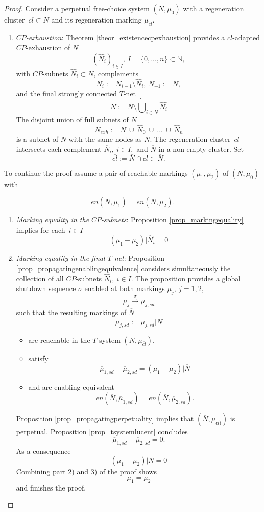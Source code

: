 \documentclass{fundam}
\newcommand{\qed}{}
\begin{document}
\begin{proof} Consider a perpetual free-choice system $(N,\mu_0)$ with a regeneration \mbox{cluster $cl \subset N$} and its regeneration marking $\mu_{cl}$.
\begin{enumerate}
\item \emph{$CP$-exhaustion}: Theorem \ref{theor_existencecpexhaustion} provides a $cl$-adapted
$CP$-exhaustion of $N$
$${(\hat{N}_i)}_{i \in I},\ I=\{0,...,n\} \subset \mathbb{N},$$
with $CP$-subnets $\hat{N}_i \subset N$, complements
$$\overline{N}_i:=\overline{N}_{i-1}\setminus \hat{N}_i,\ \overline{N}_{-1}:=N,$$
and the final strongly connected $T$-net
$$\overline{N}:=N\setminus \dot\bigcup_{i\in N} \hat{N_i}$$
The disjoint union of full subnets of $N$
$$N_{exh}:= \overline{N}\ \dot\cup\ \hat{N}_0\ \dot\cup \ ...\ \dot\cup \ \hat{N}_n$$
is a subnet of $N$ with the same nodes as $N$. The regeneration \mbox{cluster $cl$} intersects each complement
$\overline{N}_i,\ i \in I,$ and $\overline{N}$ in a non-empty cluster. Set
$$\overline{cl}:= \overline{N} \cap cl \subset \overline{N}.$$
\end{enumerate}\bigskip
\begin{flushleft}
To continue the proof assume a pair of reachable markings $(\mu_1,\mu_2)$ of $(N,\mu_0)$ with
\end{flushleft}
$$en(N,\mu_1)=en(N,\mu_2).$$
\begin{enumerate}[start=2]
\item \emph{Marking equality in the $CP$-subnets}:
Proposition \ref{prop_markingequality} implies for \mbox{each $i \in I$}
$$(\mu_1-\mu_2)|\hat{N}_i=0$$
\item \emph{Marking equality in the final $T$-net}: Proposition \ref{prop_propagatingenablingequivalence} considers simultaneously the collection of all $CP$-subnets  $\hat{N}_i,\ i \in I$. The proposition provides a global shutdown sequence $\sigma$ enabled at both markings $\mu_j,\ j=1,2,$
$$\mu_j \xrightarrow{\sigma} \mu_{j,sd}$$
such that the resulting markings of $\overline{N}$
$$\overline{\mu}_{j,sd}:=\mu_{j,sd}|\overline{N}$$
\begin{itemize}
\item are reachable in the $T$-system $(\overline{N},\mu_{\overline{cl}})$,
\item satisfy
$$\overline{\mu}_{1,sd}-\overline{\mu}_{2,sd}=(\mu_1-\mu_2)|\overline{N}$$
\item and are enabling equivalent
$$en(\overline{N},\overline{\mu}_{1,sd})=en(\overline{N},\overline{\mu}_{2,sd}).$$
\end{itemize}

\noindent Proposition \ref{prop_propagatingperpetuality} implies that $(\overline{N},\mu_{\overline{cl})})$ is perpetual. Proposition \ref{prop_tsystemlucent} concludes
$$\overline{\mu}_{1,sd}-\overline{\mu}_{2,sd}=0.$$
As a consequence
$$(\mu_{1} - \mu_{2})|\overline{N}=0$$
Combining part 2) and 3) of the proof shows
$$\mu_1=\mu_2$$
and finishes the proof.\qed
\end{enumerate}

\vspace*{-6mm}
\end{proof}
\end{document}
